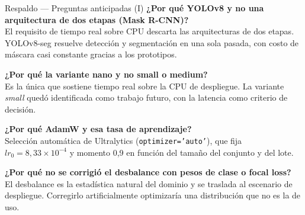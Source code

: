 \documentclass[aspectratio=169,11pt]{beamer}
\begin{document}
\begin{frame}{Respaldo --- Preguntas anticipadas (I)}
  \small
  \textbf{¿Por qué YOLOv8 y no una arquitectura de dos etapas (Mask R-CNN)?}\\
  El requisito de tiempo real sobre CPU descarta las arquitecturas de dos etapas. YOLOv8-seg
  resuelve detección y segmentación en una sola pasada, con costo de máscara casi constante
  gracias a los prototipos.
  \vspace{0.6em}

  \textbf{¿Por qué la variante nano y no small o medium?}\\
  Es la única que sostiene tiempo real sobre la CPU de despliegue. La variante \emph{small}
  quedó identificada como trabajo futuro, con la latencia como criterio de decisión.
  \vspace{0.6em}

  \textbf{¿Por qué AdamW y esa tasa de aprendizaje?}\\
  Selección automática de Ultralytics (\texttt{optimizer='auto'}), que fija
  $lr_0 = 8{,}33\times10^{-4}$ y momento 0,9 en función del tamaño del conjunto y del lote.
  \vspace{0.6em}

  \textbf{¿Por qué no se corrigió el desbalance con pesos de clase o focal loss?}\\
  El desbalance es la estadística natural del dominio y se traslada al escenario de
  despliegue. Corregirlo artificialmente optimizaría una distribución que no es la de uso.
\end{frame}
\end{document}
